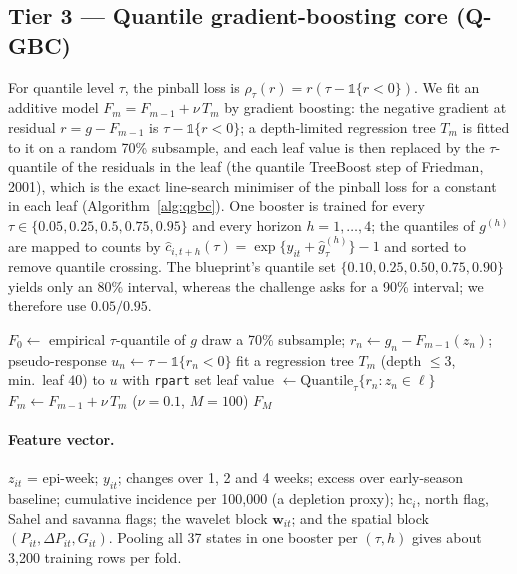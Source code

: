 \documentclass[11pt,a4paper]{article}
\newcommand{\hc}{\mathrm{hc}}
\begin{document}
\subsection{Tier 3 --- Quantile gradient-boosting core (Q-GBC)}
For quantile level $\tau$, the pinball loss is $\rho_\tau(r)=r(\tau-\mathbb 1\{r<0\})$. We fit an additive model $F_m=F_{m-1}+\nu\,T_m$ by gradient boosting: the negative gradient at residual $r=g-F_{m-1}$ is $\tau-\mathbb 1\{r<0\}$; a depth-limited regression tree $T_m$ is fitted to it on a random 70\% subsample, and each leaf value is then replaced by the $\tau$-quantile of the residuals in the leaf (the quantile TreeBoost step of Friedman, 2001), which is the exact line-search minimiser of the pinball loss for a constant in each leaf (Algorithm~\ref{alg:qgbc}). One booster is trained for every $\tau\in\{0.05,0.25,0.5,0.75,0.95\}$ and every horizon $h=1,\dots,4$; the quantiles of $g^{(h)}$ are mapped to counts by $\hat c_{i,t+h}(\tau)=\exp\{y_{it}+\hat g^{(h)}_\tau\}-1$ and sorted to remove quantile crossing. The blueprint's quantile set $\{0.10,0.25,0.50,0.75,0.90\}$ yields only an 80\% interval, whereas the challenge asks for a 90\% interval; we therefore use $0.05/0.95$.

\begin{algorithm}[H]
\caption{Q-GBC for quantile $\tau$ (pinball-loss boosting with leaf re-fitting)}\label{alg:qgbc}
\begin{algorithmic}[1]
\State $F_0\gets$ empirical $\tau$-quantile of $g$
 \State draw a 70\% subsample; $r_n\gets g_n-F_{m-1}(z_n)$; pseudo-response $u_n\gets\tau-\mathbb 1\{r_n<0\}$
 \State fit a regression tree $T_m$ (depth $\le 3$, min.\ leaf $40$) to $u$ with \texttt{rpart}
  \State set leaf value $\gets \mathrm{Quantile}_\tau\{r_n: z_n\in\ell\}$ \EndFor
 \State $F_m\gets F_{m-1}+\nu\,T_m$ \quad ($\nu=0.1$, $M=100$)
\EndFor
\State \Return $F_M$
\end{algorithmic}
\end{algorithm}

\paragraph{Feature vector.} $z_{it}$ = epi-week; $y_{it}$; changes over 1, 2 and 4 weeks; excess over early-season baseline; cumulative incidence per 100{,}000 (a depletion proxy); $\hc_i$, north flag, Sahel and savanna flags; the wavelet block $\bm w_{it}$; and the spatial block $(P_{it},\Delta P_{it},G_{it})$. Pooling all 37 states in one booster per $(\tau,h)$ gives about 3{,}200 training rows per fold.
\end{document}
